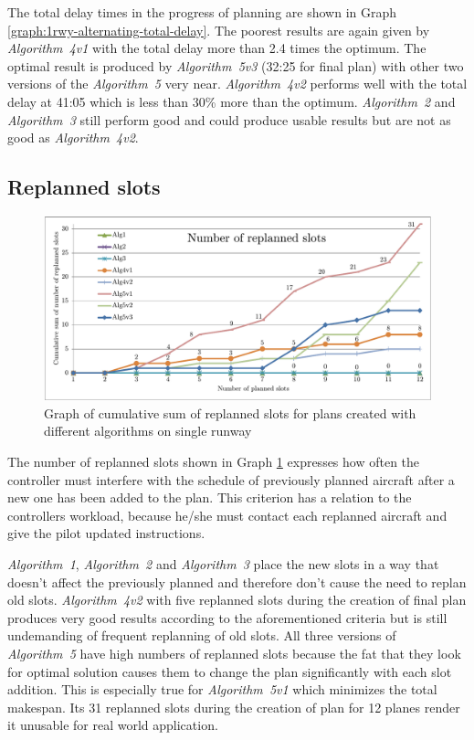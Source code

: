 The total delay times in the progress of planning are shown in Graph \ref{graph:1rwy-alternating-total-delay}. The poorest results are again given by {\em Algorithm~4v1} with the total delay more than 2.4 times the optimum. The optimal result is produced by {\em Algorithm~5v3} (32:25 for final plan) with other two versions of the {\em Algorithm~5} very near. {\em Algorithm~4v2} performs well with the total delay at 41:05 which is less than 30\% more than the optimum. {\em Algorithm~2} and {\em Algorithm~3} still perform good and could produce usable results but are not as good as {\em Algorithm~4v2}.

\subsection{Replanned slots}

\begin{figure}[h]
    \centering
    \includegraphics[width=\textwidth]{graphs/1rwy-alternating-replanned-slots.pdf}
    \caption{Graph of cumulative sum of replanned slots for plans created with different algorithms on single runway}
    \label{graph:1rwy-alternating-replanned-slots}
\end{figure}

The number of replanned slots shown in Graph \ref{graph:1rwy-alternating-replanned-slots} expresses how often the controller must interfere with the schedule of previously planned aircraft after a new one has been added to the plan. This criterion has a relation to the controllers workload, because he/she must contact each replanned aircraft and give the pilot updated instructions.

{\em Algorithm~1}, {\em Algorithm~2} and {\em Algorithm~3} place the new slots in a way that doesn't affect the previously planned and therefore don't cause the need to replan old slots. {\em Algorithm~4v2} with five replanned slots during the creation of final plan produces very good results according to the aforementioned criteria but is still undemanding of frequent replanning of old slots. All three versions of {\em Algorithm~5} have high numbers of replanned slots because the fat that they look for optimal solution causes them to change the plan significantly with each slot addition. This is especially true for {\em Algorithm~5v1} which minimizes the total makespan. Its 31 replanned slots during the creation of plan for 12 planes render it unusable for real world application.

